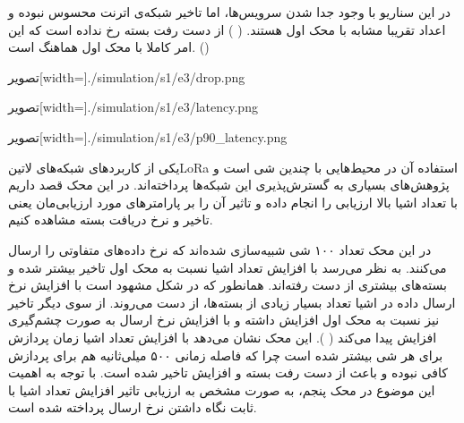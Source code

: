 در این سناریو با وجود جدا شدن سرویس‌ها، اما تاخیر شبکه‌ی اترنت محسوس نبوده و اعداد تقریبا مشابه با محک اول هستند.
( )
از دست رفت بسته رخ نداده است که این امر کاملا با محک اول هماهنگ است. ()

‌تصویر[width=\textwidth]{./simulation/s1/e3/drop.png}

‌تصویر[width=\textwidth]{./simulation/s1/e3/latency.png}

‌تصویر[width=\textwidth]{./simulation/s1/e3/p90_latency.png}



یکی از کاربردهای شبکه‌های ‌لاتین{LoRa} استفاده آن در محیط‌هایی با چندین شی است و پژوهش‌های بسیاری به گسترش‌پذیری این شبکه‌ها پرداخته‌اند.
در این محک قصد داریم با تعداد اشیا بالا ارزیابی را انجام داده و تاثیر آن را بر پارامترهای مورد ارزیابی‌مان یعنی تاخیر و نرخ دریافت بسته مشاهده کنیم.

در این محک تعداد ۱۰۰ شی شبیه‌سازی شده‌اند که نرخ داده‌های متفاوتی را ارسال می‌کنند. به نظر می‌رسد با افزایش تعداد اشیا نسبت به محک‌ اول تاخیر بیشتر شده و بسته‌های بیشتری
از دست رفته‌اند. همانطور که در شکل  مشهود است با افزایش نرخ ارسال داده در اشیا
تعداد بسیار زیادی از بسته‌ها، از دست می‌روند.
از سوی دیگر تاخیر نیز نسبت به محک اول افزایش داشته و با افزایش نرخ ارسال به صورت چشم‌گیری افزایش پیدا می‌کند
( ).
این محک نشان می‌دهد با افزایش تعداد اشیا زمان پردازش برای هر شی بیشتر شده است چرا که فاصله زمانی ۵۰۰ میلی‌ثانیه هم برای پردازش کافی نبوده و باعث از دست رفت بسته و
افزایش تاخیر شده است. با توجه به اهمیت این موضوع در محک پنجم، به صورت مشخص به ارزیابی تاثیر افزایش تعداد اشیا با ثابت نگاه داشتن نرخ ارسال پرداخته شده است.

